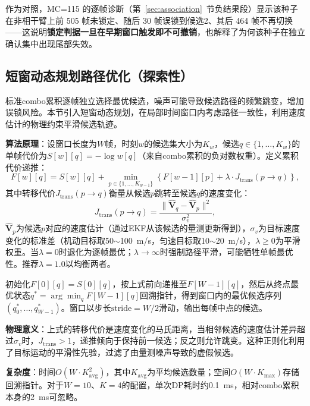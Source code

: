 \documentclass[UTF8,a4paper,zihao=-4]{ctexart}
\begin{document}
作为对照，MC=115 的逐帧诊断（第~\ref{sec:association}~节负结果段）显示该种子在非相干臂上前 505 帧未锁定、随后 30 帧误锁到候选2、其后 464 帧不再切换——这说明\textbf{锁定判据一旦在早期窗口触发即不可撤销}，也解释了为何该种子在独立确认集中出现尾部失效。

\subsection{短窗动态规划路径优化（探索性）}

标准combo累积逐帧独立选择最优候选，噪声可能导致候选路径的频繁跳变，增加误锁风险。本节引入短窗动态规划\cite{renVG2026}，在局部时间窗口内考虑路径一致性，利用速度估计的物理约束平滑候选轨迹。

\textbf{算法原理}：设窗口长度为\(W\)帧，时刻\(w\)的候选集大小为\(K_w\)，候选\(q\in\{1,\ldots,K_w\}\)的单帧代价为\(S[w][q]=-\log w[q]\)（来自combo累积的负对数权重）。定义累积代价递推：
\begin{equation}
F[w][q] = S[w][q] + \min_{p\in\{1,\ldots,K_{w-1}\}} \left\{ F[w-1][p] + \lambda \cdot J_{\text{trans}}(p\to q) \right\},
\end{equation}
其中转移代价\(J_{\text{trans}}(p\to q)\)衡量从候选\(p\)跳转至候选\(q\)的速度变化：
\begin{equation}
J_{\text{trans}}(p\to q) = \frac{\|\hat{\mathbf{V}}_q - \hat{\mathbf{V}}_p\|^2}{\sigma_v^2},
\end{equation}
\(\hat{\mathbf{V}}_p\)为候选\(p\)对应的速度估计（通过EKF从该候选的量测更新得到），\(\sigma_v\)为目标速度变化的标准差（机动目标取50\(\sim\)100~m/s，匀速目标取10\(\sim\)20~m/s），\(\lambda\geq 0\)为平滑权重。当\(\lambda=0\)时退化为逐帧最优；\(\lambda\to\infty\)时强制路径平滑，可能牺牲单帧最优性。推荐\(\lambda=1.0\)以均衡两者。

初始化\(F[0][q]=S[0][q]\)，按上式前向递推至\(F[W-1][q]\)，然后从终点最优状态\(q^*=\arg\min_q F[W-1][q]\)回溯指针，得到窗口内的最优候选序列\((q_0^*,\ldots,q_{W-1}^*)\)。窗口以步长\(\text{stride}=W/2\)滑动，输出每帧中点的候选。

\textbf{物理意义}：上式的转移代价是速度变化的马氏距离，当相邻候选的速度估计差异超过\(\sigma_v\)时，\(J_{\text{trans}}>1\)，递推倾向于保持前一候选；反之则允许跳变。这种正则化利用了目标运动的平滑性先验，过滤了由量测噪声导致的虚假候选。

\textbf{复杂度}：时间\(O(W\cdot K_{\text{avg}}^2)\)，其中\(K_{\text{avg}}\)为平均候选数量；空间\(O(W\cdot K_{\text{max}})\)存储回溯指针。对于\(W=10\)、\(K=4\)的配置，单次DP耗时约0.1~ms，相对combo累积本身的2~ms可忽略。
\end{document}
